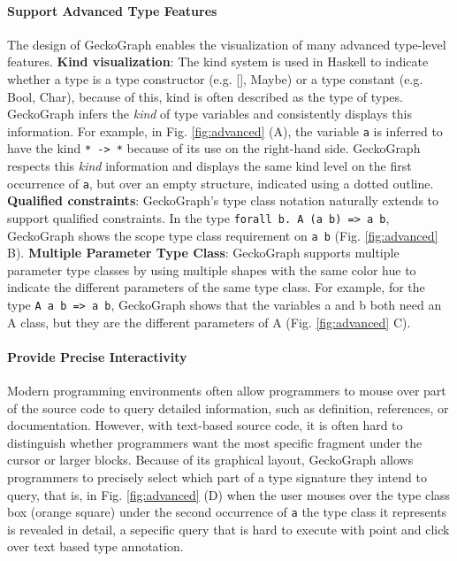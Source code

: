 \documentclass[preprint,12pt]{elsarticle}
\begin{document}
\paragraph{Support Advanced Type Features}
The design of GeckoGraph enables the visualization of many advanced type-level features. \textbf{Kind visualization}: The kind system \cite{Jones1995-lm} is used in Haskell to indicate whether a type is a type constructor (e.g. [], Maybe) or a type constant (e.g. Bool, Char), because of this, kind is often described as the type of types. GeckoGraph infers the {\it kind} of type variables and consistently displays this information. For example, in Fig. \ref{fig:advanced} (A), the variable \texttt{a} is inferred to have the kind \texttt{* -> *} because of its use on the right-hand side. GeckoGraph respects this {\it kind} information and displays the same kind level on the first occurrence of \texttt{a}, but over an empty structure, indicated using a dotted outline. \textbf{Qualified constraints}: GeckoGraph's type class notation naturally extends to support qualified constraints. In the type \texttt{forall b. A (a b) => a b}, GeckoGraph shows the scope type class requirement on \texttt{a b} (Fig. \ref{fig:advanced} B).
\textbf{Multiple Parameter Type Class}:  GeckoGraph supports multiple parameter type classes by using multiple shapes with the same color hue to indicate the different parameters of the same type class. For example, for the type \texttt{A a b => a b},  GeckoGraph shows that the variables a and b both need an A class, but they are the different parameters of A (Fig. \ref{fig:advanced} C).

\paragraph{Provide Precise Interactivity}
Modern programming environments often allow programmers to mouse over part of the source code to query detailed information, such as definition, references, or documentation. However, with text-based source code, it is often hard to distinguish whether programmers want the most specific fragment under the cursor or larger blocks. Because of its graphical layout, GeckoGraph allows programmers to precisely select which part of a type signature they intend to query, that is, in Fig. \ref{fig:advanced} (D) when the user mouses over the type class box (orange square) under the second occurrence of \texttt{a} the type class it represents is revealed in detail, a sepecific query that is hard to execute with point and click over text based type annotation.
\end{document}
